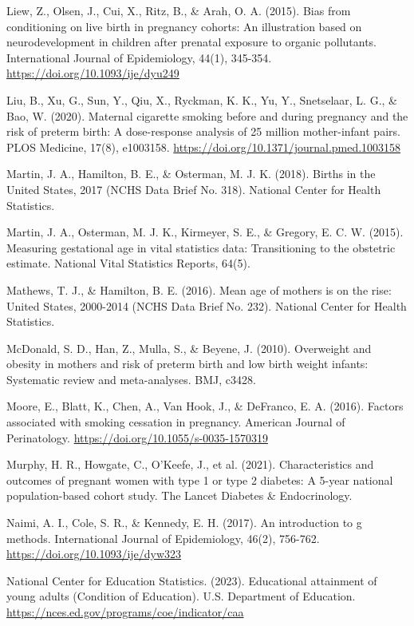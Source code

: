 \documentclass[11pt,letterpaper]{article}
\begin{document}
{Liew, Z., Olsen, J., Cui, X., Ritz, B., \& Arah, O. A. (2015). Bias from conditioning on live birth in pregnancy cohorts: An illustration based on neurodevelopment in children after prenatal exposure to organic pollutants. International Journal of Epidemiology, 44(1), 345-354. \url{https://doi.org/10.1093/ije/dyu249}

Liu, B., Xu, G., Sun, Y., Qiu, X., Ryckman, K. K., Yu, Y., Snetselaar, L. G., \& Bao, W. (2020). Maternal cigarette smoking before and during pregnancy and the risk of preterm birth: A dose-response analysis of 25 million mother-infant pairs. PLOS Medicine, 17(8), e1003158. \url{https://doi.org/10.1371/journal.pmed.1003158}

Martin, J. A., Hamilton, B. E., \& Osterman, M. J. K. (2018). Births in the United States, 2017 (NCHS Data Brief No. 318). National Center for Health Statistics.

Martin, J. A., Osterman, M. J. K., Kirmeyer, S. E., \& Gregory, E. C. W. (2015). Measuring gestational age in vital statistics data: Transitioning to the obstetric estimate. National Vital Statistics Reports, 64(5).

Mathews, T. J., \& Hamilton, B. E. (2016). Mean age of mothers is on the rise: United States, 2000-2014 (NCHS Data Brief No. 232). National Center for Health Statistics.

McDonald, S. D., Han, Z., Mulla, S., \& Beyene, J. (2010). Overweight and obesity in mothers and risk of preterm birth and low birth weight infants: Systematic review and meta-analyses. BMJ, c3428.

Moore, E., Blatt, K., Chen, A., Van Hook, J., \& DeFranco, E. A. (2016). Factors associated with smoking cessation in pregnancy. American Journal of Perinatology. \url{https://doi.org/10.1055/s-0035-1570319}

Murphy, H. R., Howgate, C., O'Keefe, J., et al. (2021). Characteristics and outcomes of pregnant women with type 1 or type 2 diabetes: A 5-year national population-based cohort study. The Lancet Diabetes \& Endocrinology.

Naimi, A. I., Cole, S. R., \& Kennedy, E. H. (2017). An introduction to g methods. International Journal of Epidemiology, 46(2), 756-762. \url{https://doi.org/10.1093/ije/dyw323}

National Center for Education Statistics. (2023). Educational attainment of young adults (Condition of Education). U.S. Department of Education. \url{https://nces.ed.gov/programs/coe/indicator/caa}

}
\end{document}
